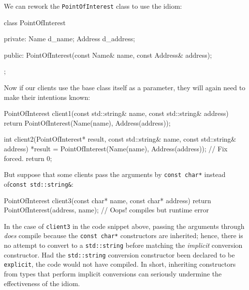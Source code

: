 \noindent We can rework the \lstinline!PointOfInterest! class to use the
 idiom:

\begin{emcppslisting}[language=C++]
class PointOfInterest
{
private:
    Name    d_name;
    Address d_address;

public:
    PointOfInterest(const Name& name, const Address& address);
};
\end{emcppslisting}
    
\noindent Now if our clients use the base class itself as a parameter, they will
again need to make their intentions known:

\begin{emcppslisting}[language=C++]
PointOfInterest client1(const std::string& name, const std::string& address)    
{                                                                               
    return PointOfInterest(Name(name), Address(address));
} 

int client2(PointOfInterest*   result,                                          
            const std::string& name,                                            
            const std::string& address)                                         
{
   *result = PointOfInterest(Name(name), Address(address)); // Fix forced.     
    return 0;                                                                   
}
\end{emcppslisting}
    
\noindent But suppose that some clients pass the arguments by
\lstinline!const!~\lstinline!char*! instead of\linebreak[4]
\mbox{\lstinline!const!~\lstinline!std::string&!}:

\begin{emcppslisting}[language=C++]
PointOfInterest client3(const char* name, const char* address)
{
    return PointOfInterest(address, name);  // Oops! compiles but runtime error
}
\end{emcppslisting}
    
\noindent In the case of \lstinline!client3! in the code snippet above, passing the arguments through
\emph{does} compile because the \lstinline!const!~\lstinline!char*!
constructors are inherited; hence, there is no attempt to convert
to a \lstinline!std::string! before matching the \emph{implicit} conversion
constructor. Had the \lstinline!std::string! conversion
constructor been declared to be \lstinline!explicit!, the code would not
have compiled. In short, inheriting constructors from types that perform implicit
conversions can seriously undermine the effectiveness of the  idiom.

